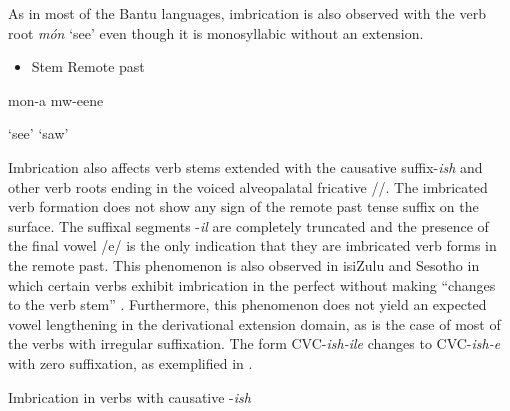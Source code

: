 \documentclass[output=paper]{langsci/langscibook}
\begin{document}
As in most of the Bantu languages, imbrication is also observed with the verb root \emph{món} ‘see’ even though it is monosyllabic without an extension. 

\begin{itemize}
\item \begin{stylelsLanginfo}
   Stem          Remote past
\end{stylelsLanginfo}\end{itemize}
\begin{stylelsSourceline}
    mon-a          mw-eene  
\end{stylelsSourceline}

\begin{stylelsTranslation}
‘see’          ‘saw’
\end{stylelsTranslation}

Imbrication also affects verb stems extended with the causative suffix-\emph{ish} and other verb roots ending in the voiced alveopalatal fricative //. The imbricated verb formation does not show any sign of the remote past tense suffix on the surface. The suffixal segments -\emph{il} are completely truncated and the presence of the final vowel /e/ is the only indication that they are imbricated verb forms in the remote past. This phenomenon is also observed in isiZulu and Sesotho in which certain verbs exhibit imbrication in the perfect without making “changes to the verb stem” \citep{Monich2015}. Furthermore, this phenomenon does not yield an expected vowel lengthening in the derivational extension domain, as is the case of most of the verbs with irregular suffixation. The form CVC-\emph{ish-ile} changes to CVC-\emph{ish-e} with zero suffixation, as exemplified in .

\begin{table}
\caption{Imbrication in verbs with causative -\emph{ish}}
\label{tab:24}
\end{table}
\end{document}
